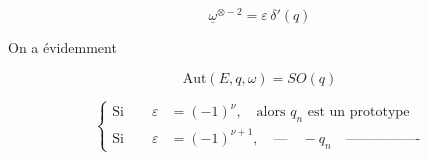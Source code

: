 \[
 \boxed{\underline{\omega}^{\otimes-2}=\varepsilon\,\delta'(q)}\tag*{(2.3)}
\]


On a évidemment

\[
 \mathrm{Aut}(E,q,\omega)=SO(q)\tag*{(2.4)}
\]

\[
 \left\{\begin{aligned}
 \text{Si}\qquad\varepsilon&=(-1)^\nu,\quad\text{alors }q_n\text{ est un prototype}\\
 \text{Si}\qquad\varepsilon&=(-1)^{\nu+1},\quad\text{---}\quad -q_n\quad\text{----------------}
 \end{aligned}\right.
\]

